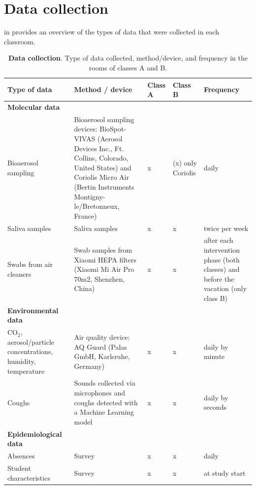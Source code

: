 \documentclass[fleqn,11pt]{wlscirep_supp}
\begin{document}
\newpage

\section{Data collection}\label{sec:data-collection}

 in \supp provides an overview of the types of data that were collected in each classroom.

\begin{table}[!htpb]
    \footnotesize
    \centering
    \caption{\textbf{Data collection}. Type of data collected, method/device, and frequency in the rooms of classes A and B.}
    \begin{tabular}{p{3.5cm}p{6cm} p{1cm} p{1cm} p{3cm}}
    \midrule
    Type of data & Method / device & Class A & Class B & Frequency \\
    \midrule
    \textbf{Molecular data} \\
    \midrule
    Bioaerosol sampling & Bioaerosol sampling devices: BioSpot-VIVAS (Aerosol Devices Inc., Ft. Collins, Colorado, United States) and Coriolis Micro Air (Bertin Instruments Montigny-le/Bretonneux, France) & x & (x) \newline only Coriolis & daily \\
    Saliva samples & Saliva samples & x & x & twice per week \\
    Swabs from air cleaners & Swab samples from Xiaomi HEPA filters (Xiaomi Mi Air Pro 70m2, Shenzhen, China) & x & x & after each intervention phase (both classes) and before the vacation (only class B) \\ 
    \midrule
    \textbf{Environmental data} \\
    \midrule
    CO$_2$, aerosol/particle concentrations, humidity, temperature & Air quality device: AQ Guard (Palas GmbH, Karlsruhe, Germany) & x & x & daily by minute \\
    Coughs & Sounds collected via microphones and coughs detected with a Machine Learning model \cite{Bertschinger2023CBMS} & x & x & daily by seconds \\
    \midrule
    \textbf{Epidemiological data} \\
    \midrule
    Absences & Survey & x & x & daily \\
    Student characteristics & Survey & x & x & at study start \\
    \bottomrule
    \end{tabular}
    \label{tab:data}
\end{table}
\end{document}
